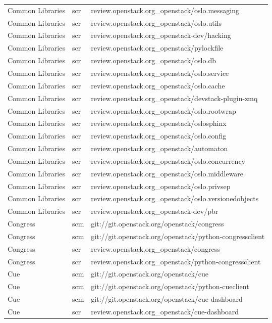 \begin{center}
\begin{longtable}{|p{4cm}|p{1cm}|p{10cm}|}
Common Libraries&scr&review.openstack.org\_openstack/oslo.messaging\\ 
Common Libraries&scr&review.openstack.org\_openstack/oslo.utils\\ 
Common Libraries&scr&review.openstack.org\_openstack-dev/hacking\\ 
Common Libraries&scr&review.openstack.org\_openstack/pylockfile\\ 
Common Libraries&scr&review.openstack.org\_openstack/oslo.db\\ 
Common Libraries&scr&review.openstack.org\_openstack/oslo.service\\ 
Common Libraries&scr&review.openstack.org\_openstack/oslo.cache\\ 
Common Libraries&scr&review.openstack.org\_openstack/devstack-plugin-zmq\\ 
Common Libraries&scr&review.openstack.org\_openstack/oslo.rootwrap\\ 
Common Libraries&scr&review.openstack.org\_openstack/oslosphinx\\ 
Common Libraries&scr&review.openstack.org\_openstack/oslo.config\\ 
Common Libraries&scr&review.openstack.org\_openstack/automaton\\ 
Common Libraries&scr&review.openstack.org\_openstack/oslo.concurrency\\ 
Common Libraries&scr&review.openstack.org\_openstack/oslo.middleware\\ 
Common Libraries&scr&review.openstack.org\_openstack/oslo.privsep\\ 
Common Libraries&scr&review.openstack.org\_openstack/oslo.versionedobjects\\ 
Common Libraries&scr&review.openstack.org\_openstack-dev/pbr\\ 
Congress&scm&git://git.openstack.org/openstack/congress\\ 
Congress&scm&git://git.openstack.org/openstack/python-congressclient\\ 
Congress&scr&review.openstack.org\_openstack/congress\\ 
Congress&scr&review.openstack.org\_openstack/python-congressclient\\ 
Cue&scm&git://git.openstack.org/openstack/cue\\ 
Cue&scm&git://git.openstack.org/openstack/python-cueclient\\ 
Cue&scm&git://git.openstack.org/openstack/cue-dashboard\\ 
Cue&scr&review.openstack.org\_openstack/cue-dashboard\\ 

\end{longtable}
\end{center}
